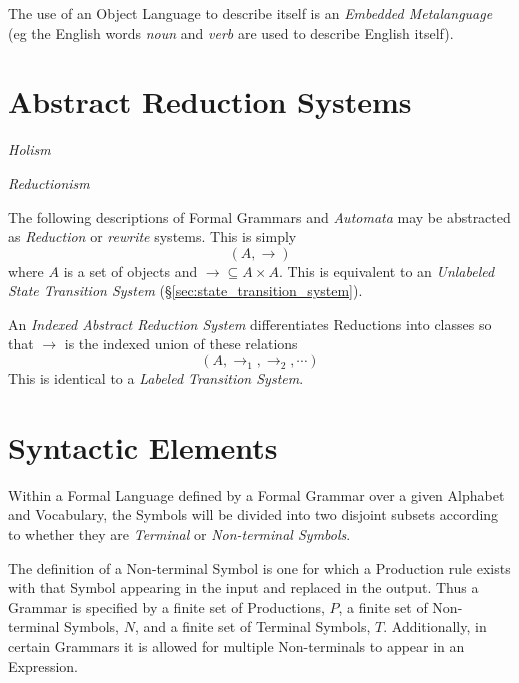 \documentclass{article}
\begin{document}
The use of an Object Language to describe itself is an \emph{Embedded
  Metalanguage} (eg the English words \emph{noun} and \emph{verb} are
used to describe English itself).

\section{Abstract Reduction Systems}\label{sec:abstract_rewrite}

\emph{Holism}

\emph{Reductionism}

The following descriptions of Formal Grammars and \emph{Automata} may
be abstracted as \emph{Reduction} or \emph{rewrite} systems. This is
simply
    \[(A,\rightarrow)\]
where $A$ is a set of objects and $\rightarrow \subseteq A \times
A$. This is equivalent to an \emph{Unlabeled State Transition System}
(\S\ref{sec:state_transition_system}).

An \emph{Indexed Abstract Reduction System} differentiates Reductions
into classes so that $\rightarrow$ is the indexed union of these
relations
    \[(A, \rightarrow_1, \rightarrow_2, \cdots)\]
This is identical to a \emph{Labeled Transition System}.

\section{Syntactic Elements}

Within a Formal Language defined by a Formal Grammar over a given
Alphabet and Vocabulary, the Symbols will be divided into two disjoint
subsets according to whether they are \emph{Terminal} or
\emph{Non-terminal Symbols}.

The definition of a Non-terminal Symbol is one for which a Production
rule exists with that Symbol appearing in the input and replaced in
the output. Thus a Grammar is specified by a finite set of
Productions, $P$, a finite set of Non-terminal Symbols, $N$, and a
finite set of Terminal Symbols, $T$. Additionally, in certain Grammars
it is allowed for multiple Non-terminals to appear in an Expression.
\end{document}
